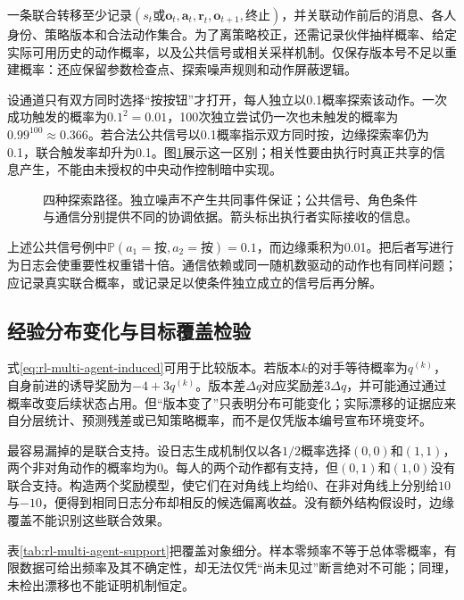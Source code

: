 一条联合转移至少记录$(s_t\text{或}\bm o_t,\bm a_t,\bm r_t,\bm o_{t+1},\text{终止})$，并关联动作前后的消息、各人身份、策略版本和合法动作集合。为了离策略校正，还需记录伙伴抽样概率、给定实际可用历史的动作概率，以及公共信号或相关采样机制。仅保存版本号不足以重建概率：还应保留参数检查点、探索噪声规则和动作屏蔽逻辑。

设通道只有双方同时选择“按按钮”才打开，每人独立以0.1概率探索该动作。一次成功触发的概率为$0.1^2=0.01$，100次独立尝试仍一次也未触发的概率为$0.99^{100}\approx0.366$。若合法公共信号以0.1概率指示双方同时按，边缘探索率仍为0.1，联合触发率却升为0.1。图\ref{fig:rl-multi-agent-exploration}展示这一区别；相关性要由执行时真正共享的信息产生，不能由未授权的中央动作控制暗中实现。

\begin{figure}[htbp]
 \centering
 
 \caption{四种探索路径。独立噪声不产生共同事件保证；公共信号、角色条件与通信分别提供不同的协调依据。箭头标出执行者实际接收的信息。}
 \label{fig:rl-multi-agent-exploration}
\end{figure}

上述公共信号例中$\mathbb P(a_1=\text{按},a_2=\text{按})=0.1$，而边缘乘积为0.01。把后者写进行为日志会使重要性权重错十倍。通信依赖或同一随机数驱动的动作也有同样问题；应记录真实联合概率，或记录足以使条件独立成立的信号后再分解。

\subsection{经验分布变化与目标覆盖检验}
\label{sec:rl-multi-agent-coverage}

式\eqref{eq:rl-multi-agent-induced}可用于比较版本。若版本$k$的对手等待概率为$q^{(k)}$，自身前进的诱导奖励为$-4+3q^{(k)}$。版本差$\Delta q$对应奖励差$3\Delta q$，并可能通过通过概率改变后续状态占用。但“版本变了”只表明分布可能变化；实际漂移的证据应来自分层统计、预测残差或已知策略概率，而不是仅凭版本编号宣布环境变坏。

最容易漏掉的是联合支持。设日志生成机制仅以各$1/2$概率选择$(0,0)$和$(1,1)$，两个非对角动作的概率均为0。每人的两个动作都有支持，但$(0,1)$和$(1,0)$没有联合支持。构造两个奖励模型，使它们在对角线上均给0、在非对角线上分别给$10$与$-10$，便得到相同日志分布却相反的候选偏离收益。没有额外结构假设时，边缘覆盖不能识别这些联合效果。

表\ref{tab:rl-multi-agent-support}把覆盖对象细分。样本零频率不等于总体零概率，有限数据可给出频率及其不确定性，却无法仅凭“尚未见过”断言绝对不可能；同理，未检出漂移也不能证明机制恒定。

